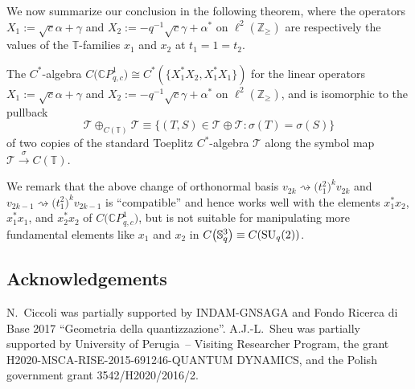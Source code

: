 \documentclass[pdftex]{sigma}
\begin{document}
We now summarize our conclusion in the following theorem, where the operators
$X_{1}:=\sqrt{c}\alpha+\gamma$ and $X_{2}:=-q^{-1}\sqrt{c}\gamma+\alpha^{\ast
}$ on $\ell^{2} ( \mathbb{Z}_{\geq} ) $ are respectively the values
of the $\mathbb{T}$-families $x_{1}$ and $x_{2}$ at $t_{1}=1=t_{2}$.

\begin{theorem}\label{final} The $C^*$-algebra $C\big( \mathbb{C}P_{q,c}^{1}\big)
\cong C^{\ast} ( \{ X_{1}^{\ast}X_{2},X_{1}^{\ast}X_{1} \}
 ) $ for the linear operators $X_{1}:=\sqrt{c}\alpha+\gamma$ and
$X_{2}:=-q^{-1}\sqrt{c}\gamma+\alpha^{\ast}$ on $\ell^{2} (
\mathbb{Z}_{\geq} ) $, and is isomorphic to the pullback
\[
\mathcal{T}\oplus_{C ( \mathbb{T} ) }\mathcal{T}\equiv\big\{
 ( T,S ) \in\mathcal{T}\oplus\mathcal{T}\colon \sigma(T)
=\sigma ( S ) \big\}
\]
of two copies of the standard Toeplitz $C^*$-algebra $\mathcal{T}$ along the
symbol map $\mathcal{T}\overset{\sigma}{\rightarrow}C( \mathbb{T})$.
\end{theorem}

We remark that the above change of orthonormal basis $v_{2k}\rightsquigarrow
\big( t_{1}^{2}\big) ^{k}v_{2k}$ and $v_{2k-1}\rightsquigarrow\big(
t_{1}^{2}\big) ^{k}v_{2k-1}$ is ``compatible'' and hence works well with the elements
$x_{1}^{\ast}x_{2}$, $x_{1}^{\ast}x_{1}$, and $x_{2}^{\ast}x_{2}$ of $C\big(
\mathbb{C}P_{q,c}^{1}\big) $, but is not suitable for manipulating more
fundamental elements like $x_{1}$ and $x_{2}$ in $C\big( \mathbb{S}_{q}^{3}\big) \equiv C( {\rm SU}_{q}(2)) $.

\subsection*{Acknowledgements}

N.~Ciccoli was partially supported by INDAM-GNSAGA and Fondo Ricerca di
Base 2017 ``Geometria della quantizzazione''.
A.J.-L.~Sheu was partially supported by University of Perugia~-- Visiting Researcher
Program, the grant H2020-MSCA-RISE-2015-691246-QUANTUM DYNAMICS, and the
Polish government grant 3542/H2020/2016/2.
\end{document}
